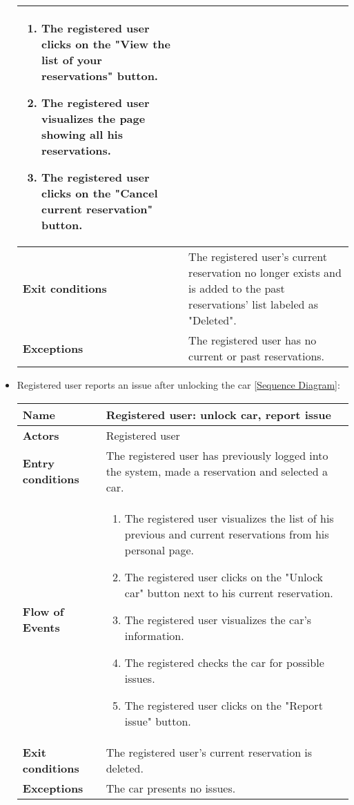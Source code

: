 \begin{itemize}
\begin{table}[H]
\begin{tabular}{| m{3.5cm} | m{9.5cm} |}
\begin{enumerate}
			\item The registered user clicks on the "View the list of your reservations" button.
			\item The registered user visualizes the page showing all his reservations.
			\item The registered user clicks on the "Cancel current reservation" button.
		\end{enumerate} \\
		\hline
		\textbf{Exit conditions} & The registered user's current reservation no longer exists and is added to the past reservations' list labeled as "Deleted".\\
		\hline
		\textbf{Exceptions} & The registered user has no current or past reservations.\\
		\hline
	\end{tabular}
\end{table}
\newpage
\item Registered user reports an issue after unlocking the car [\hyperlink{ReportIssue}{Sequence Diagram}]:
\begin{table}[H]
	\centering
	\begin{tabular}{| m{3.5cm} | m{9.5cm} |}
		\hline
		\textbf{Name} & Registered user: unlock car, report issue\\
		\hline
		\textbf{Actors} & Registered user\\
		\hline
		\textbf{Entry conditions} & The registered user has previously logged into the system, made a reservation and selected a car.\\
		\hline
		\textbf{Flow of Events} & 
		\begin{enumerate}
			\item The registered user visualizes the list of his previous and current reservations from his personal page.
			\item The registered user clicks on the "Unlock car" button next to his current reservation.
			\item The registered user visualizes the car's information.
			\item The registered checks the car for possible issues.
			\item The registered user clicks on the "Report issue" button.   
		\end{enumerate} \\
		\hline
		\textbf{Exit conditions} & The registered user's current reservation is deleted.\\
		\hline
		\textbf{Exceptions} & The car presents no issues.\\

\end{tabular}
\end{table}
\end{itemize}
